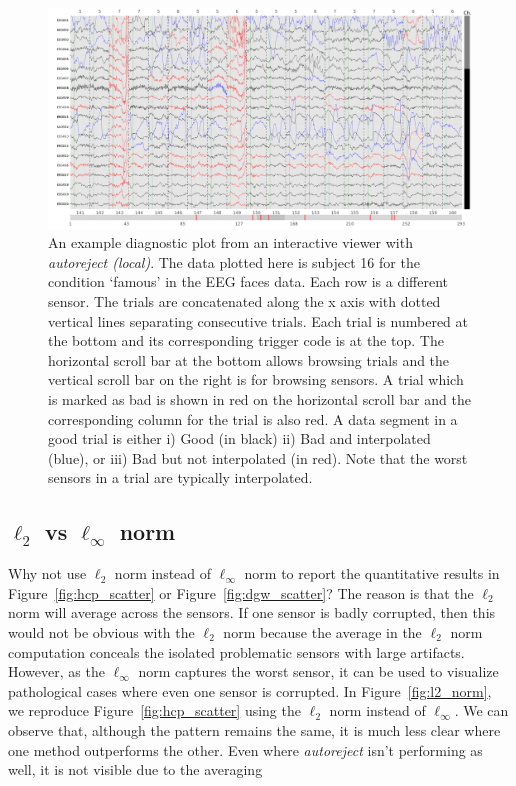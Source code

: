 \clearpage
\begin{figure}
	\centering
	\includegraphics[width=\textwidth]{figures/figure8.pdf}
    \caption[An example diagnostic plot from an interactive viewer with \emph{autoreject (local)}]{An example diagnostic plot from an interactive viewer with \emph{autoreject (local)}. The data plotted here is subject 16 for the condition `famous' in the EEG faces data. Each row is a different sensor. The trials are concatenated along the x axis with dotted vertical lines separating consecutive trials. Each trial is numbered at the bottom and its corresponding trigger code is at the top. The horizontal scroll bar at the bottom allows browsing trials and the vertical scroll bar on the right is for browsing sensors. A trial which is marked as bad is shown in red on the horizontal scroll bar and the corresponding column for the trial is also red. A data segment in a good trial is either i) Good (in black) ii) Bad and interpolated (blue), or iii) Bad but not interpolated (in red). Note that the worst sensors in a trial are typically interpolated.}
    \label{fig:diagnostic_plot}
\end{figure}
\clearpage

\subsection{$\ell_{2}$ vs $\ell_{\infty}$ norm} 
\label{sec:l2_vs_linf}

Why not use $\ell_{2}$ norm instead of $\ell_{\infty}$ norm to report the quantitative results in Figure~\ref{fig:hcp_scatter} or Figure~\ref{fig:dgw_scatter}? The reason is that the $\ell_{2}$ norm will average across the sensors. If one sensor is badly corrupted, then this would not be obvious with the $\ell_{2}$ norm because the average in the $\ell_{2}$ norm computation conceals the isolated problematic sensors with large artifacts. However, as the $\ell_\infty$ norm captures the worst sensor, it can be used to visualize pathological cases where even one sensor is corrupted. In Figure~\ref{fig:l2_norm}, we reproduce Figure~\ref{fig:hcp_scatter} using the $\ell_2$ norm instead of $\ell_{\infty}$. We can observe that, although the pattern remains the same, it is much less clear where one method outperforms the other. Even where \emph{autoreject} isn't performing as well, it is not  visible due to the averaging %

